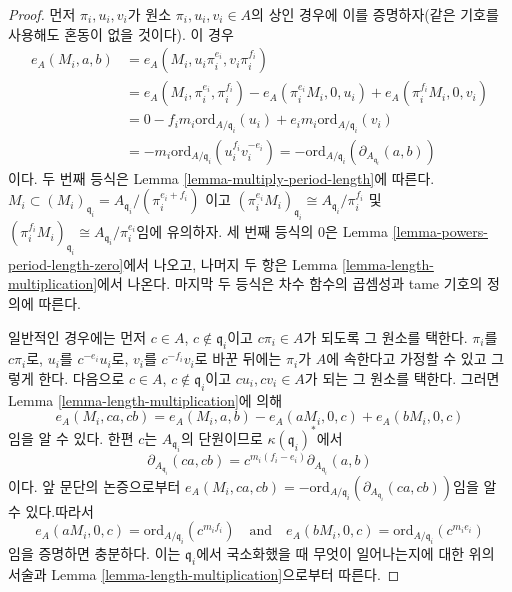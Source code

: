 \begin{proof}
\medskip\noindent
먼저 $\pi_i, u_i, v_i$가 원소 $\pi_i, u_i, v_i \in A$의 상인 경우에
이를 증명하자(같은 기호를 사용해도 혼동이 없을 것이다). 이 경우
\begin{align*}
e_A(M_i, a, b) & =
e_A(M_i, u_i\pi_i^{e_i}, v_i\pi_i^{f_i}) \\
& =
e_A(M_i, \pi_i^{e_i}, \pi_i^{f_i}) -
e_A(\pi_i^{e_i}M_i, 0, u_i) +
e_A(\pi_i^{f_i}M_i, 0, v_i) \\
& =
0 -
f_im_i\text{ord}_{A/\mathfrak q_i}(u_i) +
e_im_i\text{ord}_{A/\mathfrak q_i}(v_i) \\
& =
-m_i\text{ord}_{A/\mathfrak q_i}(u_i^{f_i}v_i^{-e_i}) =
-\text{ord}_{A/\mathfrak q_i}(\partial_{A_{\mathfrak q_i}}(a, b))
\end{align*}
이다. 두 번째 등식은 Lemma \ref{lemma-multiply-period-length}에 따른다.
$M_i \subset (M_i)_{\mathfrak q_i} = A_{\mathfrak q_i}/(\pi_i^{e_i + f_i})$
이고
$(\pi_i^{e_i}M_i)_{\mathfrak q_i} \cong A_{\mathfrak q_i}/\pi_i^{f_i}$ 및
$(\pi_i^{f_i}M_i)_{\mathfrak q_i} \cong A_{\mathfrak q_i}/\pi_i^{e_i}$임에
유의하자. 세 번째 등식의 $0$은 Lemma
\ref{lemma-powers-period-length-zero}에서 나오고, 나머지 두 항은
Lemma \ref{lemma-length-multiplication}에서 나온다. 마지막 두 등식은
차수 함수의 곱셈성과 tame 기호의 정의에 따른다.

\medskip\noindent
일반적인 경우에는 먼저 $c \in A$, $c \not \in \mathfrak q_i$이고
$c\pi_i \in A$가 되도록 그 원소를 택한다. $\pi_i$를 $c\pi_i$로,
$u_i$를 $c^{-e_i}u_i$로, $v_i$를 $c^{-f_i}v_i$로 바꾼 뒤에는
$\pi_i$가 $A$에 속한다고 가정할 수 있고 그렇게 한다. 다음으로
$c \in A$, $c \not \in \mathfrak q_i$이고 $cu_i, cv_i \in A$가 되는
그 원소를 택한다. 그러면 Lemma \ref{lemma-length-multiplication}에 의해
$$
e_A(M_i, ca, cb) = e_A(M_i, a, b) - e_A(aM_i, 0, c) + e_A(bM_i, 0, c)
$$
임을 알 수 있다. 한편 $c$는 $A_{\mathfrak q_i}$의 단원이므로
$\kappa(\mathfrak q_i)^*$에서
$$
\partial_{A_{\mathfrak q_i}}(ca, cb) =
c^{m_i(f_i - e_i)}\partial_{A_{\mathfrak q_i}}(a, b)
$$
이다. 앞 문단의 논증으로부터
$e_A(M_i, ca, cb) = -
\text{ord}_{A/\mathfrak q_i}(\partial_{A_{\mathfrak q_i}}(ca, cb))$임을
알 수 있다.따라서
$$
e_A(aM_i, 0, c) = \text{ord}_{A/\mathfrak q_i}(c^{m_if_i})
\quad\text{and}\quad
e_A(bM_i, 0, c) = \text{ord}_{A/\mathfrak q_i}(c^{m_ie_i})
$$
임을 증명하면 충분하다. 이는 $\mathfrak q_i$에서 국소화했을 때
무엇이 일어나는지에 대한 위의 서술과 Lemma
\ref{lemma-length-multiplication}으로부터 따른다.
\end{proof}

